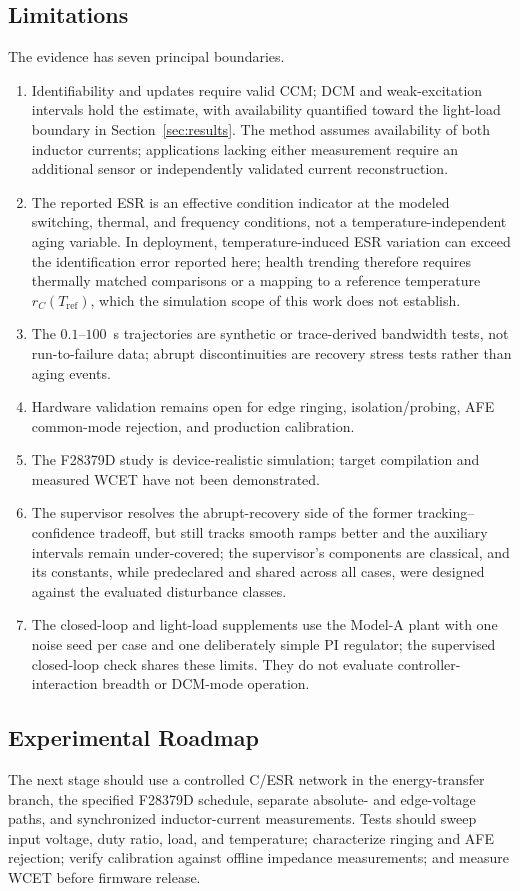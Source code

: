\subsection{Limitations}

The evidence has seven principal boundaries.
\begin{enumerate}
\item Identifiability and updates require valid CCM; DCM and weak-excitation intervals hold the estimate, with availability quantified toward the light-load boundary in Section~\ref{sec:results}. The method assumes availability of both inductor currents; applications lacking either measurement require an additional sensor or independently validated current reconstruction.
\item The reported ESR is an effective condition indicator at the modeled switching, thermal, and frequency conditions, not a temperature-independent aging variable. In deployment, temperature-induced ESR variation can exceed the identification error reported here; health trending therefore requires thermally matched comparisons or a mapping to a reference temperature $r_C(T_{\mathrm{ref}})$, which the simulation scope of this work does not establish.
\item The $0.1$--$100$~s trajectories are synthetic or trace-derived bandwidth tests, not run-to-failure data; abrupt discontinuities are recovery stress tests rather than aging events.
\item Hardware validation remains open for edge ringing, isolation/probing, AFE common-mode rejection, and production calibration.
\item The F28379D study is device-realistic simulation; target compilation and measured WCET have not been demonstrated.
\item The supervisor resolves the abrupt-recovery side of the former tracking--confidence tradeoff, but \TSRLS{} still tracks smooth ramps better and the auxiliary \TSRLS{} intervals remain under-covered; the supervisor's components are classical, and its constants, while predeclared and shared across all cases, were designed against the evaluated disturbance classes.
\item The closed-loop and light-load supplements use the Model-A plant with one noise seed per case and one deliberately simple PI regulator; the supervised closed-loop check shares these limits. They do not evaluate controller-interaction breadth or DCM-mode operation.
\end{enumerate}

\subsection{Experimental Roadmap}

The next stage should use a controlled C/ESR network in the energy-transfer branch, the specified F28379D schedule, separate absolute- and edge-voltage paths, and synchronized inductor-current measurements. Tests should sweep input voltage, duty ratio, load, and temperature; characterize ringing and AFE rejection; verify calibration against offline impedance measurements; and measure WCET before firmware release.
